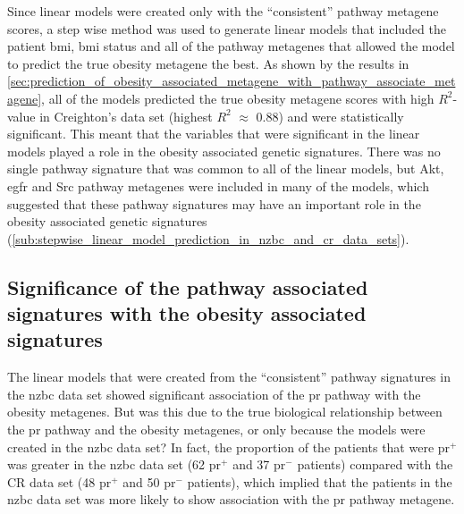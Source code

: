 Since linear models were created only with the ``consistent'' pathway metagene scores, a step wise method was used to generate linear models that included the patient \gls{bmi}, \gls{bmi} status and all of the pathway metagenes that allowed the model to predict the true obesity metagene the best.
As shown by the results in \cref{sec:prediction_of_obesity_associated_metagene_with_pathway_associate_metagene}, all of the models predicted the true obesity metagene scores with high $R^2$-value in Creighton's data set (highest $R^2$ $\approx$ 0.88) and were statistically significant.
This meant that the variables that were significant in the linear models played a role in the obesity associated genetic signatures.
There was no single pathway signature that was common to all of the linear models, but Akt, \gls{egfr} and Src pathway metagenes were included in many of the models, which suggested that these pathway signatures may have an important role in the obesity associated genetic signatures (\cref{sub:stepwise_linear_model_prediction_in_nzbc_and_cr_data_sets}).

\subsection{Significance of the pathway associated signatures with the obesity associated signatures}
\label{sub:significance_of_pr_pathway}

The linear models that were created from the ``consistent'' pathway signatures in the \gls{nzbc} data set showed significant association of the \gls{pr} pathway with the obesity metagenes.
But was this due to the true biological relationship between the \gls{pr} pathway and the obesity metagenes, or only because the models were created in the \gls{nzbc} data set?
In fact, the proportion of the patients that were \gls{pr}$^+$ was greater in the \gls{nzbc} data set (62 \gls{pr}$^+$ and 37 \gls{pr}$^-$ patients) compared with the CR data set (48 \gls{pr}$^+$ and 50 \gls{pr}$^-$ patients), which implied that the patients in the \gls{nzbc} data set was more likely to show association with the \gls{pr} pathway metagene.

